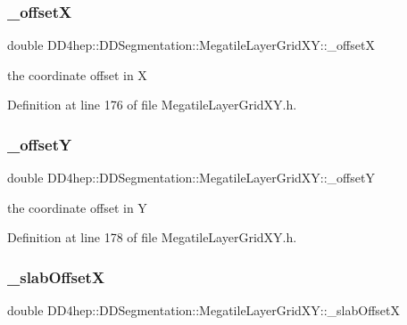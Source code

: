 \subsubsection{\texorpdfstring{\+\_\+offsetX}{\_offsetX}}
{\footnotesize\ttfamily double D\+D4hep\+::\+D\+D\+Segmentation\+::\+Megatile\+Layer\+Grid\+X\+Y\+::\+\_\+offsetX\hspace{0.3cm}{\ttfamily [protected]}}



the coordinate offset in X 



Definition at line 176 of file Megatile\+Layer\+Grid\+X\+Y.\+h.

\hypertarget{class_d_d4hep_1_1_d_d_segmentation_1_1_megatile_layer_grid_x_y_ae20ad9ed770bb9bce72ee3838a6abb59}{}\label{class_d_d4hep_1_1_d_d_segmentation_1_1_megatile_layer_grid_x_y_ae20ad9ed770bb9bce72ee3838a6abb59} 
\subsubsection{\texorpdfstring{\+\_\+offsetY}{\_offsetY}}
{\footnotesize\ttfamily double D\+D4hep\+::\+D\+D\+Segmentation\+::\+Megatile\+Layer\+Grid\+X\+Y\+::\+\_\+offsetY\hspace{0.3cm}{\ttfamily [protected]}}



the coordinate offset in Y 



Definition at line 178 of file Megatile\+Layer\+Grid\+X\+Y.\+h.

\hypertarget{class_d_d4hep_1_1_d_d_segmentation_1_1_megatile_layer_grid_x_y_a2a958dcddea84e48565a2a42f4ebcf10}{}\label{class_d_d4hep_1_1_d_d_segmentation_1_1_megatile_layer_grid_x_y_a2a958dcddea84e48565a2a42f4ebcf10} 
\subsubsection{\texorpdfstring{\+\_\+slab\+OffsetX}{\_slabOffsetX}}
{\footnotesize\ttfamily double D\+D4hep\+::\+D\+D\+Segmentation\+::\+Megatile\+Layer\+Grid\+X\+Y\+::\+\_\+slab\+OffsetX\hspace{0.3cm}{\ttfamily [protected]}}



